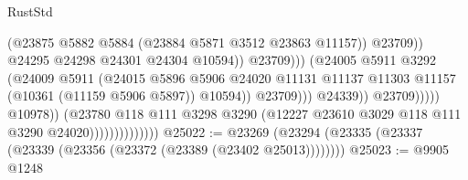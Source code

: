 \begin{lexlean}{RustStd}
\begin{coremodule}
                                                                (@23875
                                                                  @5882
                                                                  @5884
                                                                  (@23884
                                                                    @5871
                                                                    @3512
                                                                    @23863
                                                                    @11157))
                                                                @23709))
                                                            @24295
                                                            @24298
                                                            @24301
                                                            @24304
                                                            @10594))
                                                        @23709)))
                                                  (@24005
                                                    @5911
                                                    @3292
                                                    (@24009
                                                      @5911
                                                      (@24015
                                                        @5896
                                                        @5906
                                                        @24020
                                                        @11131
                                                        @11137
                                                        @11303
                                                        @11157
                                                        (@10361 (@11159 @5906 @5897))
                                                        @10594))
                                                    @23709)))
                                              @24339))
                                          @23709)))))
                                @10978))
                            (@23780
                              @118
                              @111
                              @3298
                              @3290
                              (@12227 @23610 @3029 @118 @111 @3290 @24020))))))))))))))
@25022 := @23269 (@23294 (@23335 (@23337 (@23339 (@23356 (@23372 (@23389 (@23402 @25013))))))))
@25023 := @9905 @1248

\end{coremodule}
\end{lexlean}
